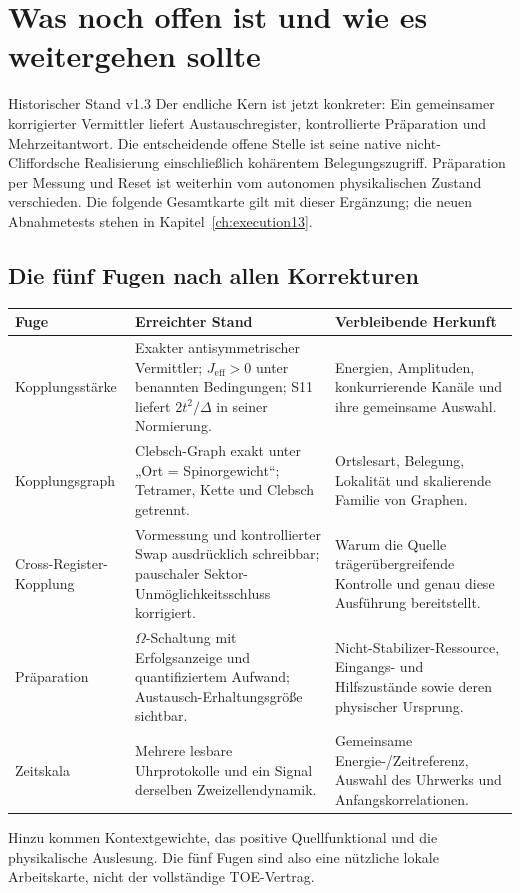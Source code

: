 \chapter{Was noch offen ist und wie es weitergehen sollte}
\label{ch:offen}
\begin{bild}{Historischer Stand v1.3}
Der endliche Kern ist jetzt konkreter: Ein gemeinsamer korrigierter Vermittler liefert Austauschregister, kontrollierte Präparation und Mehrzeitantwort. Die entscheidende offene Stelle ist seine native nicht-Cliffordsche Realisierung einschließlich kohärentem Belegungszugriff. Präparation per Messung und Reset ist weiterhin vom autonomen physikalischen Zustand verschieden. Die folgende Gesamtkarte gilt mit dieser Ergänzung; die neuen Abnahmetests stehen in Kapitel~\ref{ch:execution13}.
\end{bild}
\section{Die fünf Fugen nach allen Korrekturen}
\begin{longtable}{L{31mm}L{62mm}L{57mm}}
\toprule \textbf{Fuge}&\textbf{Erreichter Stand}&\textbf{Verbleibende Herkunft}\\\midrule\endhead
Kopplungsstärke&Exakter antisymmetrischer Vermittler; $J_{\mathrm{eff}}>0$ unter benannten Bedingungen; S11 liefert $2t^2/\Delta$ in seiner Normierung.&Energien, Amplituden, konkurrierende Kanäle und ihre gemeinsame Auswahl.\\
Kopplungsgraph&Clebsch-Graph exakt unter „Ort = Spinorgewicht“; Tetramer, Kette und Clebsch getrennt.&Ortslesart, Belegung, Lokalität und skalierende Familie von Graphen.\\
Cross-Register-Kopplung&Vormessung und kontrollierter Swap ausdrücklich schreibbar; pauschaler Sektor-Unmöglichkeitsschluss korrigiert.&Warum die Quelle trägerübergreifende Kontrolle und genau diese Ausführung bereitstellt.\\
Präparation&$\Omega$-Schaltung mit Erfolgsanzeige und quantifiziertem Aufwand; Austausch-Erhaltungsgröße sichtbar.&Nicht-Stabilizer-Ressource, Eingangs- und Hilfszustände sowie deren physischer Ursprung.\\
Zeitskala&Mehrere lesbare Uhrprotokolle und ein Signal derselben Zweizellendynamik.&Gemeinsame Energie-/Zeitreferenz, Auswahl des Uhrwerks und Anfangskorrelationen.\\\bottomrule
\end{longtable}
Hinzu kommen Kontextgewichte, das positive Quellfunktional und die physikalische Auslesung. Die fünf Fugen sind also eine nützliche lokale Arbeitskarte, nicht der vollständige TOE-Vertrag.

